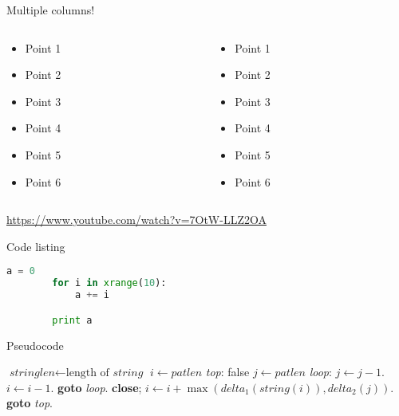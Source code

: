 \documentclass{beamer}
\begin{document}
\begin{frame}{Multiple columns!}
	\begin{columns}
		\begin{column}{0.27\textwidth}
			\begin{itemize}
				\item Point 1 \pause
				\item Point 2 \pause
				\item Point 3 \pause
				\item Point 4 \pause
				\item Point 5 \pause
				\item Point 6
			\end{itemize}
		\end{column}
		\begin{column}{0.67\textwidth}
			\begin{itemize}
				\item Point 1 \pause
				\item Point 2 \pause
				\item Point 3 \pause
				\item Point 4 \pause
				\item Point 5 \pause
				\item Point 6
			\end{itemize}
		\end{column}
	\end{columns}
\end{frame}


\begin{frame}
	\begin{center}
		\url{https://www.youtube.com/watch?v=7OtW-LLZ2OA}
	\end{center}
\end{frame}

\begin{frame}[fragile]{Code listing}
	\begin{lstlisting}[language=Python]
		a = 0
		for i in xrange(10):
			a += i

		print a
	\end{lstlisting}
\end{frame}

\begin{frame}{Pseudocode}

	{\tiny
	\begin{algorithmic}[1]
			\State $\textit{stringlen} \gets \text{length of }\textit{string}$
			\State $i \gets \textit{patlen}$ \pause
			\State \emph{top}:
			 \Return false
			\EndIf
			\State $j \gets \textit{patlen}$ \pause
			\State \emph{loop}:
				\State $j \gets j-1$.
				\State $i \gets i-1$.
				\State \textbf{goto} \emph{loop}.
				\State \textbf{close};
			\EndIf \pause
			\State $i \gets i+\max(\textit{delta}_1(\textit{string}(i)),\textit{delta}_2(j))$.
			\State \textbf{goto} \emph{top}.
		\EndProcedure
	\end{algorithmic}
	}
\end{frame}
\end{document}
